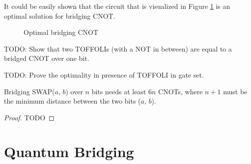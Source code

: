 It could be easily shown that the circuit that is visualized in Figure \ref{fig:optimal-bridging-cnot} is an optimal solution for bridging CNOT.

\begin{figure}[ht]
  \centering
  \caption{Optimal bridging CNOT}
  \label{fig:optimal-bridging-cnot}
\end{figure}

TODO: Show that two TOFFOLIs (with a NOT in between) are equal to a bridged CNOT over one bit.

TODO: Prove the optimality in presence of TOFFOLI in gate set.

\begin{theorem}
  Bridging SWAP($a$, $b$) over $n$ bits needs at least $6n$ CNOTs, where $n + 1$ must be the minimum distance between the two bits ($a$, $b$).
  \label{thm:bridging-swap}
\end{theorem}
\begin{proof}
  TODO
\end{proof}

\section{Quantum Bridging}

